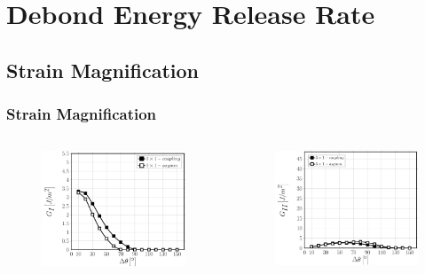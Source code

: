 \documentclass[first,firstsupp,lastsupp,last,hyperref,table]{ETHclass}
\begin{document}
\section{Debond Energy Release Rate}

\subsection{Strain Magnification}

\begin{frame}
\frametitle{\vspace{0.2cm}\small Strain Magnification}
\vspace{-1cm}
\centering
\begin{columns}[c]
\centering
\begin{column}{0.5\textwidth}
\centering
\begin{figure}
\centering
\includegraphics[width=\columnwidth]{nx1-coupling-vf60-GI-strainmagn3.pdf}
\end{figure}
\end{column}
\begin{column}{0.5\textwidth}
\centering
\begin{figure}
\centering
\includegraphics[width=\columnwidth]{nx1-coupling-vf60-GII-strainmagn3.pdf}

\end{figure}
\end{column}
\end{columns}
\end{frame}
\end{document}
